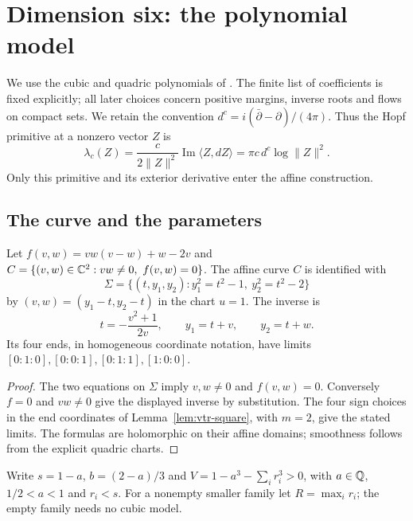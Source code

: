 \section{Dimension six: the polynomial model}\label{sec:sxm}

We use the cubic and quadric polynomials of \cite{OpenAI2026}. The finite list of
coefficients is fixed explicitly; all later choices concern positive margins, inverse
roots and flows on compact sets. We retain the convention
$d^c=i(\bar\partial-\partial)/(4\pi)$.
Thus the Hopf primitive at a nonzero vector $Z$ is
\[
 \lambda_c(Z)=\frac{c}{2\|Z\|^2}\operatorname{Im}\langle Z,dZ\rangle
             =\pi c\,d^c\log\|Z\|^2.
\]
Only this primitive and its exterior derivative enter the affine construction.

\subsection{The curve and the parameters}\label{sec:sxm-curve}

\begin{lemma}\label{lem:sxm-curve}
Let $f(v,w)=vw(v-w)+w-2v$ and
$C=\{(v,w)\in\C^2:vw\ne0,\ f(v,w)=0\}$.
The affine curve $C$ is identified with
\[
 \Sigma=\{(t,y_1,y_2):y_1^2=t^2-1,\ y_2^2=t^2-2\}
\]
by $(v,w)=(y_1-t,y_2-t)$ in the chart $u=1$.
The inverse is
\[
 t=-\frac{v^2+1}{2v},\qquad y_1=t+v,\qquad y_2=t+w.
\]
Its four ends, in homogeneous coordinate notation, have limits
$[0:1:0],[0:0:1],[0:1:1],[1:0:0]$.
\end{lemma}

\begin{proof}
The two equations on $\Sigma$ imply $v,w\ne0$ and $f(v,w)=0$.
Conversely $f=0$ and $vw\ne0$ give the displayed inverse by substitution.
The four sign choices in the end coordinates of Lemma~\ref{lem:vtr-square}, with $m=2$, give the stated limits. The formulas are holomorphic on their affine domains; smoothness follows from the explicit quadric charts.
\end{proof}

Write $s=1-a$, $b=(2-a)/3$ and
$V=1-a^3-\sum_i r_i^3>0$, with $a\in\mathbb{Q}$, $1/2<a<1$ and $r_i<s$.
For a nonempty smaller family let $R=\max_i r_i$; the empty family needs no cubic model.

